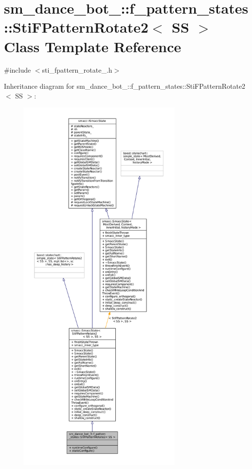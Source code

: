 \hypertarget{structsm__dance__bot__3_1_1f__pattern__states_1_1StiFPatternRotate2}{}\section{sm\+\_\+dance\+\_\+bot\+\_\+:\+:f\+\_\+pattern\+\_\+states\+:\+:Sti\+F\+Pattern\+Rotate2$<$ SS $>$ Class Template Reference}
\label{structsm__dance__bot__3_1_1f__pattern__states_1_1StiFPatternRotate2}


{\ttfamily \#include $<$sti\+\_\+fpattern\+\_\+rotate\+\_.\+h$>$}



Inheritance diagram for sm\+\_\+dance\+\_\+bot\+\_\+:\+:f\+\_\+pattern\+\_\+states\+:\+:Sti\+F\+Pattern\+Rotate2$<$ SS $>$\+:
\nopagebreak
\begin{figure}[H]
\begin{center}
\leavevmode
\includegraphics[height=550pt]{structsm__dance__bot__3_1_1f__pattern__states_1_1StiFPatternRotate2__inherit__graph}
\end{center}
\end{figure}


